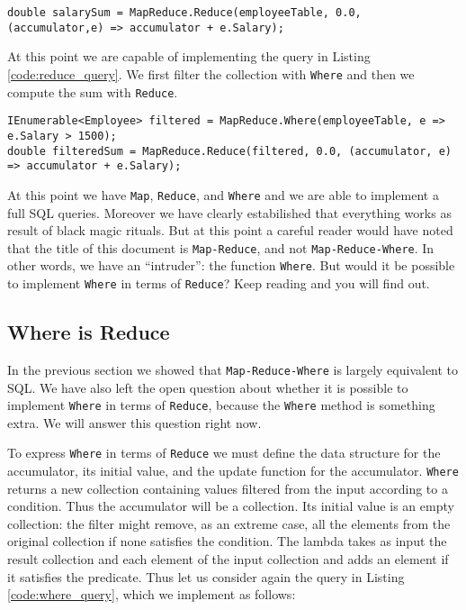 \begin{lstlisting}
double salarySum = MapReduce.Reduce(employeeTable, 0.0, (accumulator,e) => accumulator + e.Salary);
\end{lstlisting}

\noindent
At this point we are capable of implementing the query in Listing \ref{code:reduce_query}. We first filter the collection with \texttt{Where} and then we compute the sum with \texttt{Reduce}.

\begin{lstlisting}
IEnumerable<Employee> filtered = MapReduce.Where(employeeTable, e => e.Salary > 1500);
double filteredSum = MapReduce.Reduce(filtered, 0.0, (accumulator, e) => accumulator + e.Salary);
\end{lstlisting}

At this point we have \texttt{Map}, \texttt{Reduce}, and \texttt{Where} and we are able to implement a full SQL queries. Moreover we have clearly estabilished that everything works as result of black magic rituals. But at this point a careful reader would have noted that the title of this document is \texttt{Map-Reduce}, and not \texttt{Map-Reduce-Where}. In other words, we have an ``intruder'': the function \texttt{Where}. But would it be possible to implement \texttt{Where} in terms of \texttt{Reduce}? Keep reading and you will find out.

\subsection{Where is Reduce}
In the previous section we showed that \texttt{Map-Reduce-Where} is largely equivalent to SQL. We have also left the open question about whether it is possible to implement \texttt{Where} in terms of \texttt{Reduce}, because the \texttt{Where} method is something extra. We will answer this question right now.

To express \texttt{Where} in terms of \texttt{Reduce} we must define the data structure for the accumulator, its initial value, and the update function for the accumulator. \texttt{Where} returns a new collection containing values filtered from the input according to a condition. Thus the accumulator will be a collection. Its initial value is an empty collection: the filter might remove, as an extreme case, all the elements from the original collection if none satisfies the condition. The lambda takes as input the result collection and each element of the input collection and adds an element if it satisfies the predicate. Thus let us consider again the query in Listing \ref{code:where_query}, which we implement as follows:

